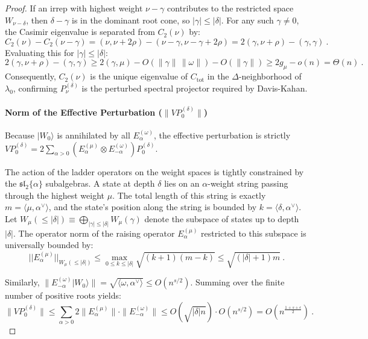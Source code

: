 \documentclass[11pt,letterpaper]{article}
\begin{document}
\begin{proof}
If an irrep with highest weight $\nu - \gamma$ contributes to the restricted space $W_{\nu-\delta}$, then $\delta - \gamma$ is in the dominant root cone, so $|\gamma| \le |\delta|$.
For any such $\gamma \neq 0$, the Casimir eigenvalue is separated from $C_2(\nu)$ by:
\begin{equation}
    C_2(\nu) - C_2(\nu-\gamma) = (\nu, \nu + 2\rho) - (\nu-\gamma, \nu-\gamma + 2\rho) = 2(\gamma, \nu+\rho) - (\gamma, \gamma) \ .
\end{equation}
Evaluating this for $|\gamma| \le |\delta|$:
\begin{equation}
    2(\gamma, \nu+\rho) - (\gamma, \gamma) \ge 2(\gamma, \mu) - O(\|\gamma\| \, \|\omega\|) - O(\|\gamma\|) \ge 2g_\mu - o(n) = \Theta(n) \ .
\end{equation}
Consequently, $C_2(\nu)$ is the unique eigenvalue of $C_{\mathrm{tot}}$ in the $\Delta$-neighborhood of $\lambda_0$, confirming $P_\nu^{(\delta)}$ is the perturbed spectral projector required by Davis-Kahan.

\paragraph{Norm of the Effective Perturbation ($\|V P_0^{(\delta)}\|$)}
Because $|W_0\rangle$ is annihilated by all $E_\alpha^{(\omega)}$, the effective perturbation is strictly $V P_0^{(\delta)} = 2 \sum_{\alpha > 0} (E_\alpha^{(\mu)} \otimes E_{-\alpha}^{(\omega)}) P_0^{(\delta)}$.

The action of the ladder operators on the weight spaces is tightly constrained by the $\mathfrak{sl}_2\{\alpha\}$ subalgebras. A state at depth $\delta$ lies on an $\alpha$-weight string passing through the highest weight $\mu$. The total length of this string is exactly $m = \langle \mu, \alpha^\vee \rangle$, and the state's position along the string is bounded by $k = \langle \delta, \alpha^\vee \rangle$. Let $W_\mu(\le |\delta|) \equiv \bigoplus_{|\gamma| \le |\delta|} W_\mu(\gamma)$ denote the subspace of states up to depth $|\delta|$. The operator norm of the raising operator $E_\alpha^{(\mu)}$ restricted to this subspace is universally bounded by:
\begin{equation}
||E_\alpha^{(\mu)}||_{W_{\mu}(\le |\delta|)} \le \max_{0 \le k \le |\delta|} \sqrt{(k+1)(m-k)} \le \sqrt{(|\delta|+1)m} \ .
\end{equation}

Similarly, $\|E_{-\alpha}^{(\omega)} |W_0\rangle\| = \sqrt{\langle \omega, \alpha^\vee \rangle} \le O(n^{s/2})$. 
Summing over the finite number of positive roots yields:
\begin{equation}
    \|V P_0^{(\delta)}\| \le \sum_{\alpha > 0} 2 \|E_\alpha^{(\mu)}\| \cdot \|E_{-\alpha}^{(\omega)}\| \le O(\sqrt{|\delta| n}) \cdot O(n^{s/2}) = O\left( n^{\frac{1+s+\epsilon}{2}} \right) \ .
\end{equation}


\end{proof}
\end{document}
